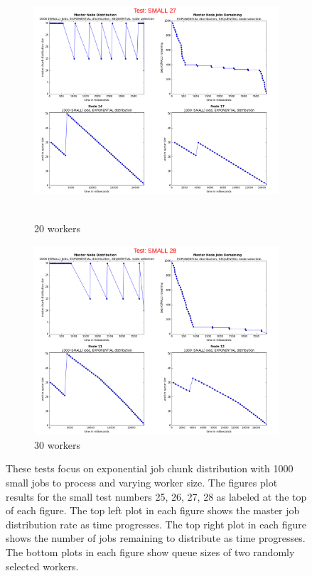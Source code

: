 \documentclass{article}
\begin{document}
\begin{figure}[p]
  
  \begin{subfigure}[b]{0.5\linewidth}
    \centering
    \hbox{\hspace{-5.0em} \includegraphics[width=1.2\linewidth]{combined_small_growing_workers_exp/case_small_27} }
    \caption{20 workers} 
    \label{testExpSmall20} 
    \vspace{4ex}
  \end{subfigure}%
  \begin{subfigure}[b]{0.5\linewidth}
    \centering
    \includegraphics[width=1.2\linewidth]{combined_small_growing_workers_exp/case_small_28} 
    \caption{30 workers} 
    \label{testExpSmall30} 
    \vspace{4ex}
  \end{subfigure} 
  
  
  \caption{These tests focus on exponential job chunk distribution with 1000 small jobs to process and varying worker size. The figures plot results for the small test numbers 25, 26, 27, 28 as labeled at the top of each figure. The top left plot in each figure shows the master job distribution rate as time progresses. The top right plot in each figure shows the number of jobs remaining to distribute as time progresses. The bottom plots in each figure show queue sizes of two randomly selected workers.}
  \label{testsSmallExp} 
  
\end{figure}
\end{document}
